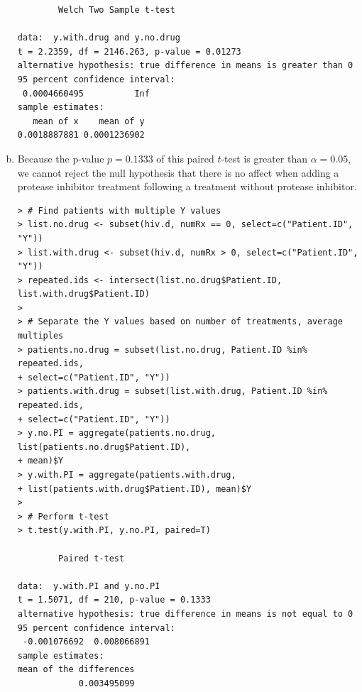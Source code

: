 \documentclass[a4paper, 10pt]{article}
\begin{document}
\begin{enumerate}[(a)]
\begin{verbatim}
        Welch Two Sample t-test

data:  y.with.drug and y.no.drug 
t = 2.2359, df = 2146.263, p-value = 0.01273
alternative hypothesis: true difference in means is greater than 0 
95 percent confidence interval:
 0.0004660495          Inf 
sample estimates:
   mean of x    mean of y 
0.0018887881 0.0001236902 

\end{verbatim}

\item Because the p-value $p = 0.1333$ of this paired $t$-test is greater than $\alpha = 0.05$, we cannot reject the null hypothesis that there is no affect when adding a protease inhibitor treatment following a treatment without protease inhibitor.

\begin{verbatim}
> # Find patients with multiple Y values
> list.no.drug <- subset(hiv.d, numRx == 0, select=c("Patient.ID", "Y"))
> list.with.drug <- subset(hiv.d, numRx > 0, select=c("Patient.ID", "Y"))
> repeated.ids <- intersect(list.no.drug$Patient.ID, list.with.drug$Patient.ID)
>
> # Separate the Y values based on number of treatments, average multiples
> patients.no.drug = subset(list.no.drug, Patient.ID %in% repeated.ids,
+ select=c("Patient.ID", "Y"))
> patients.with.drug = subset(list.with.drug, Patient.ID %in% repeated.ids,
+ select=c("Patient.ID", "Y"))
> y.no.PI = aggregate(patients.no.drug, list(patients.no.drug$Patient.ID),
+ mean)$Y
> y.with.PI = aggregate(patients.with.drug,
+ list(patients.with.drug$Patient.ID), mean)$Y
>
> # Perform t-test
> t.test(y.with.PI, y.no.PI, paired=T)

        Paired t-test

data:  y.with.PI and y.no.PI 
t = 1.5071, df = 210, p-value = 0.1333
alternative hypothesis: true difference in means is not equal to 0 
95 percent confidence interval:
 -0.001076692  0.008066891 
sample estimates:
mean of the differences 
            0.003495099
\end{verbatim}

\end{enumerate}
\end{document}
